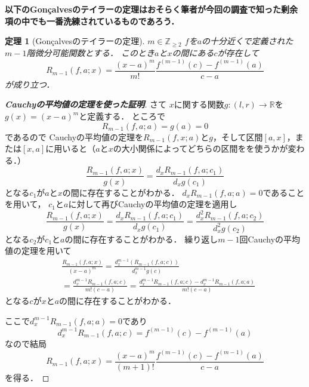 \documentclass[leqno, a4paper, 12pt]{jsarticle}
\newtheorem{thm}{定理}
\newcommand{\zz}{\mathbb{Z}}
\newcommand{\rr}{\mathbb{R}}
\newcommand{\bbb}[2]{#1^{(#2)}}
\begin{document}
\textbf{以下のGon\c{c}alvesのテイラーの定理はおそらく筆者が今回の調査で知った剰余項の中でも一番洗練されているものであろう．}
\begin{thm}[Gon\c{c}alvesのテイラーの定理]\label{thm:gon}
$m\in \zz_{\ge 2}$
$f$を$a$の十分近くで定義された$m-1$階微分可能関数とする．
このとき$a$と$x$の間にある$c$が存在して
\[
R_{m-1}(f, a; x)=\frac{(x-a)^{m}}{m!}
\frac{\bbb{f}{m-1}(c)-\bbb{f}{m-1}(a)}{c-a}
\]
が成り立つ．
\end{thm}
\begin{proof}[\textbf{Cauchyの平均値の定理を使った証明}]
さて
$x$に関する関数$g:(l,r)\to \rr$を$g(x)=(x-a)^m$と定義する．
ところで
\[
R_{m-1}(f,a;a)=g(a)=0
\]
であるので
Cauchyの平均値の定理を$R_{m-1}(f,x;a)$と$g$，そして区間$[a,x]$，または$[x,a]$に用いると（$a$と$x$の大小関係によってどちらの区間をを使うかが変わる．）
\[
\frac{R_{m-1}(f, a; x)}{g(x)}=\frac{d_{x}R_{m-1}(f, a; c_1)}{d_{x}g(c_1)}
\]
となる$c_1$が$a$と$x$の間に存在することがわかる．
$d_xR_{m-1}(f,a;a)=0$であることを用いて，
$c_1$と$a$に対して再びCauchyの平均値の定理を適用し
\[
\frac{R_{m-1}(f, a; x)}{g(x)}=\frac{d_x R_{m-1}(f, a; c_1)}{d_x g(c_1)}=\frac{d_x^2R_{m-1}(f, a; c_2)}{d_{x}^{2} g(c_2)}
\]
となる$c_2$が$c_1$と$a$の間に存在することがわかる．
繰り返し$m-1$回Cauchyの平均値の定理を用いて
\begin{align*}
&\frac{R_{m-1}(f, a;x)}{(x-a)^m}=
\frac{d_x^{m-1}(R_{m-1}(f, a; c))}{d_x^{m-1}g(c)}\\
&=\frac{d_x^{m-1}R_{m-1}(f, a; c)}{m!(c-a)}
=\frac{d_x^{m-1}R_{m-1}(f, a; c)-d_x^{m-1}R_{m-1}(f,a;a)}{m!(c-a)}
\end{align*}
となる$c$が$x$と$a$の間に存在することがわかる．

ここで$d_x^{m-1}R_{m-1}(f,a;a)=0$であり
\[
d_x^{m-1}R_{m-1}(f, a; c)
=\bbb{f}{m-1}(c)-\bbb{f}{m-1}(a)
\]
なので結局
\[
R_{m-1}(f, a; x)
=\frac{(x-a)^{m}}{(m+1)!}\frac{\bbb{f}{m-1}(c)-\bbb{f}{m-1}(a)}{c-a}
\]
を得る．
\end{proof}
\end{document}

